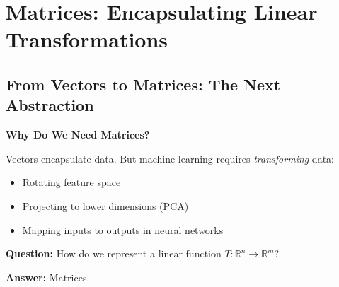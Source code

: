 \section{Matrices: Encapsulating Linear Transformations}

\subsection{From Vectors to Matrices: The Next Abstraction}

\begin{necessitybox}
    \textbf{Why Do We Need Matrices?}

    Vectors encapsulate data. But machine learning requires \textit{transforming}
    data:
    \begin{itemize}
        \item Rotating feature space
        \item Projecting to lower dimensions (PCA)
        \item Mapping inputs to outputs in neural networks
    \end{itemize}

    \textbf{Question:} How do we represent a linear function $T: \mathbb{R}^n \to \mathbb{R}^m$?

    \textbf{Answer:} Matrices.
\end{necessitybox}

